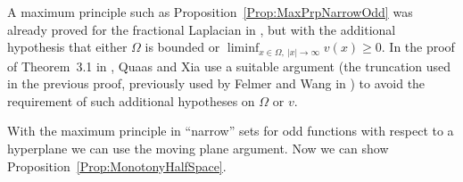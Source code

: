 \begin{remark}
	A maximum principle such as Proposition~\ref{Prop:MaxPrpNarrowOdd} was already proved for the fractional Laplacian in \cite{ChenLiLi}, but with the additional hypothesis that either $\Omega$ is bounded or $\liminf_{x\in  \Omega,\ |x|\to \infty} v(x) \geq 0$. In the proof of Theorem~3.1 in \cite{QuaasXia}, Quaas and Xia use a suitable argument (the truncation used in the previous proof, previously used by Felmer and Wang in \cite{FelmerWang}) to avoid the requirement of such additional hypotheses on $\Omega$ or $v$.
\end{remark}

With the maximum principle in ``narrow'' sets for odd functions with respect to a hyperplane we can use the moving plane argument. Now we can show Proposition~\ref{Prop:MonotonyHalfSpace}.

